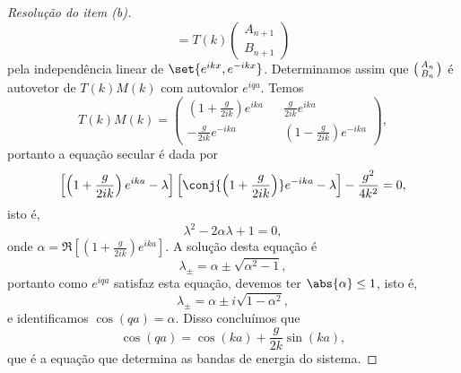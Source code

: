 \begin{proof}[Resolução do item (b)]
\begin{equation*}
        =
        T(k)
        \begin{pmatrix}
            A_{n+1}\\
            B_{n+1}
        \end{pmatrix}
    \end{equation*}
    pela independência linear de \(\set{e^{ikx}, e^{-ikx}}\). Determinamos assim que \(\begin{psmallmatrix} A_n \\ B_n\end{psmallmatrix}\) é autovetor de \(T(k) M(k)\) com autovalor \(e^{iqa}\). Temos
    \begin{equation*}
        T(k) M(k) = \begin{pmatrix}
            \left(1 + \frac{g}{2ik}\right)e^{ika} && \frac{g}{2ik} e^{ika}\\
            - \frac{g}{2ik}e^{-ika} && \left(1 - \frac{g}{2ik}\right) e^{-ika}
        \end{pmatrix},
    \end{equation*}
    portanto a equação secular é dada por
    \begin{equation*}
        \left[\left(1 + \frac{g}{2ik}\right)e^{ika} - \lambda\right]\left[\conj{\left(1 + \frac{g}{2ik}\right)}e^{-ika} - \lambda\right]- \frac{g^2}{4k^2} = 0,
    \end{equation*}
    isto é,
    \begin{equation*}
        \lambda^2 - 2 \alpha \lambda + 1 = 0,
    \end{equation*}
    onde \(\alpha = \Re\left[\left(1 + \frac{g}{2ik}\right)e^{ika}\right]\). A solução desta equação é
    \begin{equation*}
        \lambda_{\pm} = \alpha \pm \sqrt{\alpha^2 - 1},
    \end{equation*}
    portanto como \(e^{iqa}\) satisfaz esta equação, devemos ter \(\abs{\alpha} \leq 1\), isto é,
    \begin{equation*}
        \lambda_{\pm} = \alpha \pm i \sqrt{1 - \alpha^2},
    \end{equation*}
    e identificamos \(\cos(qa) = \alpha\). Disso concluímos que
    \begin{equation*}
        \cos(qa) = \cos(ka) + \frac{g}{2k} \sin(ka),
    \end{equation*}
    que é a equação que determina as bandas de energia do sistema.
\end{proof}
